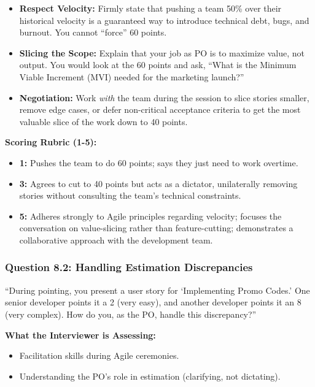 \begin{itemize}
\tightlist
\item
  \textbf{Respect Velocity:} Firmly state that pushing a team 50\% over
  their historical velocity is a guaranteed way to introduce technical
  debt, bugs, and burnout. You cannot ``force'' 60 points.
\item
  \textbf{Slicing the Scope:} Explain that your job as PO is to maximize
  value, not output. You would look at the 60 points and ask, ``What is
  the Minimum Viable Increment (MVI) needed for the marketing launch?''
\item
  \textbf{Negotiation:} Work \emph{with} the team during the session to
  slice stories smaller, remove edge cases, or defer non-critical
  acceptance criteria to get the most valuable slice of the work down to
  40 points.
\end{itemize}

\textbf{Scoring Rubric (1-5):}

\begin{itemize}
\tightlist
\item
  \textbf{1:} Pushes the team to do 60 points; says they just need to
  work overtime.
\item
  \textbf{3:} Agrees to cut to 40 points but acts as a dictator,
  unilaterally removing stories without consulting the team's technical
  constraints.
\item
  \textbf{5:} Adheres strongly to Agile principles regarding velocity;
  focuses the conversation on value-slicing rather than feature-cutting;
  demonstrates a collaborative approach with the development team.
\end{itemize}

\subsubsection{Question 8.2: Handling Estimation
Discrepancies}\label{question-8.2-handling-estimation-discrepancies}

``During pointing, you present a user story for `Implementing Promo
Codes.' One senior developer points it a 2 (very easy), and another
developer points it an 8 (very complex). How do you, as the PO, handle
this discrepancy?''

\textbf{What the Interviewer is Assessing:}

\begin{itemize}
\tightlist
\item
  Facilitation skills during Agile ceremonies.
\item
  Understanding the PO's role in estimation (clarifying, not dictating).
\end{itemize}

